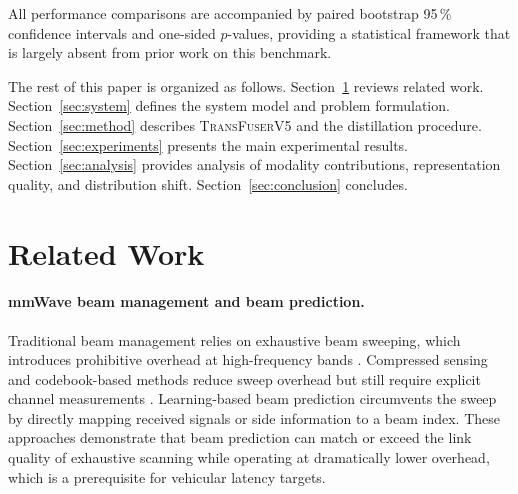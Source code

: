 \documentclass[journal,10pt,twoside]{IEEEtran}
\newcommand{\ours}{\textsc{TransFuserV5}}
\begin{document}
All performance comparisons are accompanied by paired bootstrap 95\,\%
confidence intervals and one-sided $p$-values, providing a statistical
framework that is largely absent from prior work on this benchmark.

The rest of this paper is organized as follows.
Section~\ref{sec:related} reviews related work.
Section~\ref{sec:system} defines the system model and problem formulation.
Section~\ref{sec:method} describes \ours{} and the distillation procedure.
Section~\ref{sec:experiments} presents the main experimental results.
Section~\ref{sec:analysis} provides analysis of modality contributions,
representation quality, and distribution shift.
Section~\ref{sec:conclusion} concludes.

\section{Related Work}
\label{sec:related}

\paragraph{mmWave beam management and beam prediction.}
Traditional beam management relies on exhaustive beam sweeping, which introduces
prohibitive overhead at high-frequency bands \cite{va2016beam,giordani2019tutorial}.
Compressed sensing and codebook-based methods reduce sweep overhead but still
require explicit channel measurements \cite{alkhateeb2018deep,Sohrabi2021}.
Learning-based beam prediction \cite{alkhateeb2018deep,Wang2018,Xu2021deep}
circumvents the sweep by directly mapping received signals or side information
to a beam index. These approaches demonstrate that beam prediction can match or
exceed the link quality of exhaustive scanning while operating at dramatically
lower overhead, which is a prerequisite for vehicular latency targets.
\end{document}
